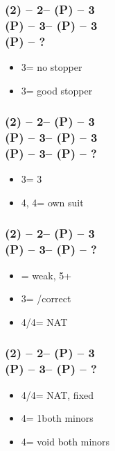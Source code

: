 \documentclass[12pt, a4paper]{article}
\begin{document}
\subsubsection*{(2\spades) -- 2\nt -- (P) -- 3\clubs \\
                (P) -- 3\diams -- (P) -- 3\hearts \\
                (P) -- ?}
\begin{itemize}
    \item 3\spades = no \spades stopper
    \item 3\nt = good \spades stopper
\end{itemize}

\subsubsection*{(2\spades) -- 2\nt -- (P) -- 3\clubs \\
                (P) -- 3\diams -- (P) -- 3\hearts \\
                (P) -- 3\spades -- (P) -- ?}
\begin{itemize}
    \item 3\nt = 3\hearts
    \item 4\clubs, 4\diams = own suit
\end{itemize}

\subsubsection*{(2\spades) -- 2\nt -- (P) -- 3\diams \\
                (P) -- 3\hearts -- (P) -- ?}
\begin{itemize}
    \item \pass = weak, 5+\hearts
    \item 3\nt = \pass/correct
    \item 4\clubs/4\diams = NAT
\end{itemize}

\subsubsection*{(2\spades) -- 2\nt -- (P) -- 3\hearts \\
                (P) -- 3\spades -- (P) -- ?}
\begin{itemize}
    \item 4\clubs/4\diams = NAT, fixed
    \item 4\hearts = 1\spades both minors
    \item 4\spades = void \spades both minors
\end{itemize}
\end{document}
